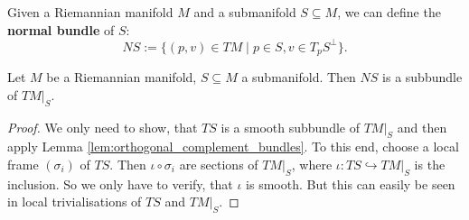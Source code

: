     Given a Riemannian manifold $M$ and a submanifold $S \subseteq M$, we can define the \textbf{normal bundle} of $S$:
    \[NS := \{(p,v) \in TM \mid p \in S, v \in T_pS^\perp\}.\]
    \begin{corollary}
        Let $M$ be a Riemannian manifold, $S\subseteq M$ a submanifold. Then $NS$ is a subbundle of $TM|_S$.
    \end{corollary}
    \begin{proof}
        We only need to show, that $TS$ is a smooth subbundle of $TM|_S$ and then apply Lemma \ref{lem:orthogonal_complement_bundles}. To this end, choose a local frame $(\sigma_i)$ of $TS$. Then $\iota \circ \sigma_i$ are sections of $TM|_S$, where $\iota \colon TS \hookrightarrow TM|_S$ is the inclusion. So we only have to verify, that $\iota$ is smooth. But this can easily be seen in local trivialisations of $TS$ and $TM|_S$.
    \end{proof}